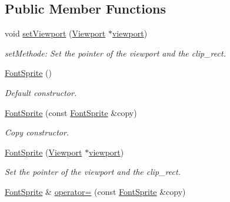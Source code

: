 \subsection*{Public Member Functions}
\begin{DoxyCompactItemize}
\item 
void \hyperlink{class_f2_c_1_1_font_sprite_ac6af1586ca99fd00365c1393f9a14817}{setViewport} (\hyperlink{class_f2_c_1_1_viewport}{Viewport} $\ast$\hyperlink{class_f2_c_1_1_font_sprite_a4f82be1613af7c8b83e5551ca6c81ed1}{viewport})
\begin{DoxyCompactList}\small\item\em setMethode: Set the pointer of the viewport and the clip\_\-rect. \item\end{DoxyCompactList}\item 
\hypertarget{class_f2_c_1_1_font_sprite_ab8375c3937eed4398ab1cfed98ca127b}{
\hyperlink{class_f2_c_1_1_font_sprite_ab8375c3937eed4398ab1cfed98ca127b}{FontSprite} ()}
\label{class_f2_c_1_1_font_sprite_ab8375c3937eed4398ab1cfed98ca127b}

\begin{DoxyCompactList}\small\item\em Default constructor. \item\end{DoxyCompactList}\item 
\hypertarget{class_f2_c_1_1_font_sprite_aa2310c7adcbabacdc4b840b54d8e4969}{
\hyperlink{class_f2_c_1_1_font_sprite_aa2310c7adcbabacdc4b840b54d8e4969}{FontSprite} (const \hyperlink{class_f2_c_1_1_font_sprite}{FontSprite} \&copy)}
\label{class_f2_c_1_1_font_sprite_aa2310c7adcbabacdc4b840b54d8e4969}

\begin{DoxyCompactList}\small\item\em Copy constructor. \item\end{DoxyCompactList}\item 
\hyperlink{class_f2_c_1_1_font_sprite_a7ce4fb660a3b32e3890807dae9b4e850}{FontSprite} (\hyperlink{class_f2_c_1_1_viewport}{Viewport} $\ast$\hyperlink{class_f2_c_1_1_font_sprite_a4f82be1613af7c8b83e5551ca6c81ed1}{viewport})
\begin{DoxyCompactList}\small\item\em Set the pointer of the viewport and the clip\_\-rect. \item\end{DoxyCompactList}\item 
\hypertarget{class_f2_c_1_1_font_sprite_ac7a37a9ada6207e49f7868dbec562ee5}{
\hyperlink{class_f2_c_1_1_font_sprite}{FontSprite} \& \hyperlink{class_f2_c_1_1_font_sprite_ac7a37a9ada6207e49f7868dbec562ee5}{operator=} (const \hyperlink{class_f2_c_1_1_font_sprite}{FontSprite} \&copy)}
\label{class_f2_c_1_1_font_sprite_ac7a37a9ada6207e49f7868dbec562ee5}


\end{DoxyCompactItemize}
